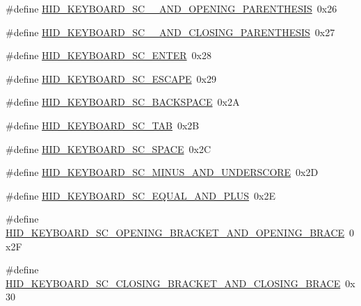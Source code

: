 \begin{DoxyCompactItemize}
\item 
\#define \hyperlink{group__Group__USBClassHIDCommon_gab0721749719c80705828f5daf00f9630}{H\+I\+D\+\_\+\+K\+E\+Y\+B\+O\+A\+R\+D\+\_\+\+S\+C\+\_\+\_\+\+A\+N\+D\+\_\+\+O\+P\+E\+N\+I\+N\+G\+\_\+\+P\+A\+R\+E\+N\+T\+H\+E\+S\+IS}~0x26
\item 
\#define \hyperlink{group__Group__USBClassHIDCommon_gae957ae7551248ab7bb001f335df365d6}{H\+I\+D\+\_\+\+K\+E\+Y\+B\+O\+A\+R\+D\+\_\+\+S\+C\+\_\+\_\+\+A\+N\+D\+\_\+\+C\+L\+O\+S\+I\+N\+G\+\_\+\+P\+A\+R\+E\+N\+T\+H\+E\+S\+IS}~0x27
\item 
\#define \hyperlink{group__Group__USBClassHIDCommon_gaa37dacf868ec4bb3250db4972418538c}{H\+I\+D\+\_\+\+K\+E\+Y\+B\+O\+A\+R\+D\+\_\+\+S\+C\+\_\+\+E\+N\+T\+ER}~0x28
\item 
\#define \hyperlink{group__Group__USBClassHIDCommon_ga3e794a0957a82e4a5bc615af20fb9290}{H\+I\+D\+\_\+\+K\+E\+Y\+B\+O\+A\+R\+D\+\_\+\+S\+C\+\_\+\+E\+S\+C\+A\+PE}~0x29
\item 
\#define \hyperlink{group__Group__USBClassHIDCommon_gab70be16e577e4e320938704b5fd954f8}{H\+I\+D\+\_\+\+K\+E\+Y\+B\+O\+A\+R\+D\+\_\+\+S\+C\+\_\+\+B\+A\+C\+K\+S\+P\+A\+CE}~0x2A
\item 
\#define \hyperlink{group__Group__USBClassHIDCommon_ga02fdce1d85d1ca6711feb0975cf77c0a}{H\+I\+D\+\_\+\+K\+E\+Y\+B\+O\+A\+R\+D\+\_\+\+S\+C\+\_\+\+T\+AB}~0x2B
\item 
\#define \hyperlink{group__Group__USBClassHIDCommon_gae909370f7202a9f76e4cd3d52e539f6a}{H\+I\+D\+\_\+\+K\+E\+Y\+B\+O\+A\+R\+D\+\_\+\+S\+C\+\_\+\+S\+P\+A\+CE}~0x2C
\item 
\#define \hyperlink{group__Group__USBClassHIDCommon_ga08d574ffb80b75649bd323cd8fb81565}{H\+I\+D\+\_\+\+K\+E\+Y\+B\+O\+A\+R\+D\+\_\+\+S\+C\+\_\+\+M\+I\+N\+U\+S\+\_\+\+A\+N\+D\+\_\+\+U\+N\+D\+E\+R\+S\+C\+O\+RE}~0x2D
\item 
\#define \hyperlink{group__Group__USBClassHIDCommon_ga042a2684edfd8f797fa0a6e52dc4af0c}{H\+I\+D\+\_\+\+K\+E\+Y\+B\+O\+A\+R\+D\+\_\+\+S\+C\+\_\+\+E\+Q\+U\+A\+L\+\_\+\+A\+N\+D\+\_\+\+P\+L\+US}~0x2E
\item 
\#define \hyperlink{group__Group__USBClassHIDCommon_ga25bf885a77fc4807e4f4a99e7c631657}{H\+I\+D\+\_\+\+K\+E\+Y\+B\+O\+A\+R\+D\+\_\+\+S\+C\+\_\+\+O\+P\+E\+N\+I\+N\+G\+\_\+\+B\+R\+A\+C\+K\+E\+T\+\_\+\+A\+N\+D\+\_\+\+O\+P\+E\+N\+I\+N\+G\+\_\+\+B\+R\+A\+CE}~0x2F
\item 
\#define \hyperlink{group__Group__USBClassHIDCommon_gabfecc129659ef96dd85cf8673b8d9a2c}{H\+I\+D\+\_\+\+K\+E\+Y\+B\+O\+A\+R\+D\+\_\+\+S\+C\+\_\+\+C\+L\+O\+S\+I\+N\+G\+\_\+\+B\+R\+A\+C\+K\+E\+T\+\_\+\+A\+N\+D\+\_\+\+C\+L\+O\+S\+I\+N\+G\+\_\+\+B\+R\+A\+CE}~0x30

\end{DoxyCompactItemize}
